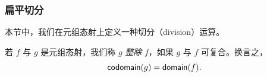 \subsubsection{扁平切分}
\label{subsubsection.flatdivision}

本节中，我们在元组态射上定义一种切分（division）运算。

\begin{definition}
    若 $f$ 与 $g$ 是元组态射，我们称 $g$ {\it 整除} $f$，如果 $g$ 与 $f$ 可复合。换言之，
    \[
    \mathsf{codomain}(g) = \mathsf{domain}(f).
    \]
\end{definition}






